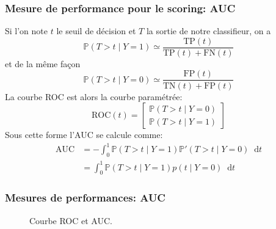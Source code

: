 \documentclass[dvipsnames,10pt]{beamer}
\newcommand*\diff{\mathop{}\!\mathrm{d}}
\theoremstyle{plain}
\theoremstyle{definition}
\begin{document}
\begin{frame}
\frametitle{Mesure de performance pour le scoring: AUC}
Si l'on note $t$ le seuil de décision et $T$ la sortie de notre classifieur, on a
\begin{equation*}
    \mathbb{P} ( T > t \mid Y = 1 ) \simeq \frac{\mathrm{TP} (t) }{\mathrm{TP} (t) +\mathrm{FN} (t) } 
\end{equation*}
et de la même façon
\begin{equation*}
    \mathbb{P} ( T > t \mid Y = 0 ) \simeq \frac{\mathrm{FP} (t)}{\mathrm{TN} (t) +\mathrm{FP} (t)}
\end{equation*}
La courbe ROC est alors la courbe paramétrée:
\begin{equation*}
    \mathrm{ROC} (t) = \begin{bmatrix}
        \mathbb{P} ( T > t \mid Y = 0 ) \\
        \mathbb{P} ( T > t \mid Y = 1 )
    \end{bmatrix}
\end{equation*}
Sous cette forme l'AUC se calcule comme:
\begin{align*}
    \mathrm{AUC} &=  - \int_0^1 \mathbb{P} ( T > t \mid Y = 1 ) \mathbb{P}' ( T > t \mid Y = 0 ) \diff t \\
    &= \int_0^1 \mathbb{P} ( T > t \mid Y = 1 ) p ( t \mid Y = 0 ) \diff t
\end{align*}
\end{frame}

\begin{frame}
\frametitle{Mesures de performances: AUC}
\begin{figure}[htbp]
\centering
    \caption{Courbe ROC et AUC.}
\end{figure}
\end{frame}
\end{document}
